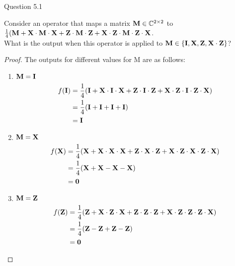 \begin{solution}{Question 5.1}\label{ques:5.1}
    \begin{question}
    Consider an operator that maps a matrix $\mathbf{M} \in \mathbb{C}^{2\times 2}$ to \\
    $\frac{1}{4}(\mathbf{M} + \mathbf{X} \cdot \mathbf{M} \cdot \mathbf{X} + \mathbf{Z} \cdot \mathbf{M} \cdot \mathbf{Z}+ \mathbf{X} \cdot \mathbf{Z} \cdot \mathbf{M} \cdot \mathbf{Z} \cdot \mathbf{X}$.\\
    What is the output when this operator is applied to $\mathbf{M} \in \{\mathbf{I}, \mathbf{X}, \mathbf{Z}, \mathbf{X} \cdot \mathbf{Z}\}$?
    \end{question}
    \tcblower{}
    \begin{proof}
    The outputs for different values for M are as follows:
    \begin{enumerate}
        \item $\mathbf{M} = \mathbf{I}$
        \begin{equation}
            \begin{split}
                f(\mathbf{I}) &=\frac{1}{4}(\mathbf{I} + \mathbf{X} \cdot \mathbf{I} \cdot \mathbf{X} + \mathbf{Z} \cdot \mathbf{I} \cdot \mathbf{Z}+ \mathbf{X} \cdot \mathbf{Z} \cdot \mathbf{I} \cdot \mathbf{Z} \cdot \mathbf{X})\\
                &=\frac{1}{4}(\mathbf{I}+\mathbf{I}+\mathbf{I}+\mathbf{I})\\
                &=\mathbf{I}
            \end{split}
        \end{equation}
        \item $\mathbf{M} = \mathbf{X}$
        \begin{equation}
            \begin{split}
                f(\mathbf{X}) &=\frac{1}{4}(\mathbf{X} + \mathbf{X} \cdot \mathbf{X} \cdot \mathbf{X} + \mathbf{Z} \cdot \mathbf{X} \cdot \mathbf{Z}+ \mathbf{X} \cdot \mathbf{Z} \cdot \mathbf{X} \cdot \mathbf{Z} \cdot \mathbf{X})\\
                &=\frac{1}{4}(\mathbf{X} + \mathbf{X} - \mathbf{X} -\mathbf{X})\\
                &=\mathbf{0}
            \end{split}
        \end{equation}
        \item $\mathbf{M} = \mathbf{Z}$
        \begin{equation}
            \begin{split}
                f(\bfZ) &=\frac{1}{4}(\bfZ + \bfX \cdot \bfZ \cdot \bfX + \bfZ \cdot \bfZ \cdot \bfZ+ \bfX \cdot \bfZ \cdot \bfZ \cdot \bfZ \cdot \bfX)\\
                &=\frac{1}{4}(\bfZ - \bfZ + \bfZ- \bfZ)\\
                &=\mathbf{0}

\end{split}
\end{equation}
\end{enumerate}
\end{proof}
\end{solution}
